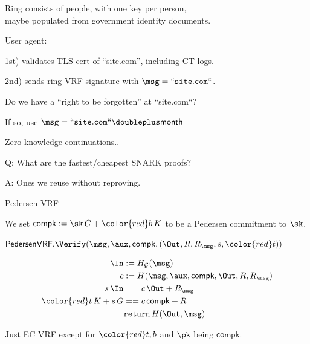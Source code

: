 \documentclass{beamer}
\def\compk{\ensuremath{\mathsf{compk}}\xspace}
\begin{document}
\begin{frame} %

Ring consists of people, with one key per person, \\ 
\hspace{10pt} maybe populated from government identity documents.

\bigskip\smallskip

User agent: \\ \smallskip

1st) validates TLS cert of ``site.com'', including CT logs. \\ \smallskip

2nd) sends ring VRF signature with $\msg = \mathtt{``site.com``}$. \\ \smallskip

\pause\bigskip\bigskip 

Do we have a ``right to be forgotten'' at ``site.com``? \\ \smallskip

\hspace{10pt} If so, use $\msg = \mathtt{``site.com``} \doubleplus \mathsf{month}$

\end{frame}



\begin{frame}
	
Zero-knowledge continuations..
	
\bigskip
	
Q: What are the fastest/cheapest SNARK proofs?
	
\bigskip
	
A: Ones we reuse without reproving.
	
\end{frame}



\begin{frame}{Pedersen VRF}

We set $\compk := \sk \, G + {\color{red} b \, K}$ to be a Pedersen commitment to $\sk$.

\bigskip\bigskip

$\mathsf{PedersenVRF}.\Verify(\msg,\aux,\compk,(\Out,R,R_\msg,s,{\color{red} t}))$
	
$$ \begin{aligned}
\In &:= H_{\mathcal{G}}(\msg) \\
c &:= H(\msg,\aux,\compk,\Out,R,R_\msg) \\
s \, \In &== c \, \Out + R_\msg \\
{\color{red} t \, K} + s \, G &== c \, \compk + R \\
& \mathtt{return} \, H(\Out,\msg) \\
\end{aligned} $$

\bigskip \bigskip

Just EC VRF except for $\color{red} t, b$ and $\pk$ being $\compk$.

\end{frame}
\end{document}

